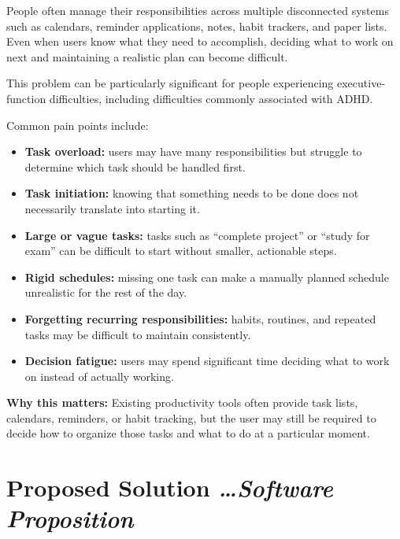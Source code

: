 \documentclass[11pt,a4paper]{article}
\newcommand{\BvrHint}[1]{%
  {\normalfont\normalsize\itshape\hfill #1}}
\begin{document}
People often manage their responsibilities across multiple disconnected
systems such as calendars, reminder applications, notes, habit trackers,
and paper lists. Even when users know what they need to accomplish, deciding
what to work on next and maintaining a realistic plan can become difficult.

This problem can be particularly significant for people experiencing
executive-function difficulties, including difficulties commonly associated
with ADHD.

Common pain points include:

\begin{itemize}[leftmargin=0.7cm]
    \item \textbf{Task overload:} users may have many responsibilities but
    struggle to determine which task should be handled first.
    
    \item \textbf{Task initiation:} knowing that something needs to be done
    does not necessarily translate into starting it.
    
    \item \textbf{Large or vague tasks:} tasks such as ``complete project''
    or ``study for exam'' can be difficult to start without smaller,
    actionable steps.
    
    \item \textbf{Rigid schedules:} missing one task can make a manually
    planned schedule unrealistic for the rest of the day.
    
    \item \textbf{Forgetting recurring responsibilities:} habits, routines,
    and repeated tasks may be difficult to maintain consistently.
    
    \item \textbf{Decision fatigue:} users may spend significant time deciding
    what to work on instead of actually working.
\end{itemize}

\textbf{Why this matters:} Existing productivity tools often provide task
lists, calendars, reminders, or habit tracking, but the user may still be
required to decide how to organize those tasks and what to do at a particular
moment.

\section{Proposed Solution %
\BvrHint{\ldots Software Proposition}}
\end{document}
